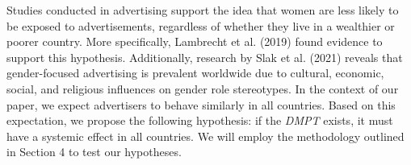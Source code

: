 \documentclass[twocolumn]{bmcart}\usepackage{lineno}
\begin{document}
Studies conducted in advertising support the idea that women are less likely to be exposed to advertisements, regardless of whether they live in a wealthier or poorer country. More specifically,  Lambrecht et al. (2019) found evidence to support this hypothesis. Additionally, research by Slak et al. (2021) reveals that gender-focused advertising is prevalent worldwide due to cultural, economic, social, and religious influences on gender role stereotypes. In the context of our paper, we expect advertisers to behave similarly in all countries. Based on this expectation, we propose the following hypothesis: if the \emph{DMPT} exists, it must have a systemic effect in all countries. We will employ the methodology outlined in Section 4 to test our hypotheses.







\color{black}
\end{document}
